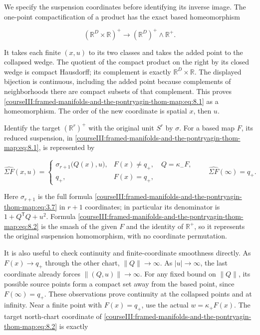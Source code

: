 \label{courseIII:pontryagin-thom:8}

We specify the suspension coordinates before identifying its inverse image. The one-point compactification of a product has the exact based homeomorphism

\begin{equation}
(\mathbb R^D\times\mathbb R)^+
       \longrightarrow(\mathbb R^D)^+\wedge\mathbb R^+.
 \label{courseIII:framed-manifolds-and-the-pontryagin-thom-map:eq:8.1}
\end{equation}

It takes each finite \((x,u)\) to its two classes and takes the added point to the collapsed wedge. The quotient of the compact product on the right by its closed wedge is compact Hausdorff; its complement is exactly \(\mathbb R^D\times\mathbb R\). The displayed bijection is continuous, including the added point because complements of neighborhoods there are compact subsets of that complement. This proves \eqref{courseIII:framed-manifolds-and-the-pontryagin-thom-map:eq:8.1} as a homeomorphism. The order of the new coordinate is spatial \(x\), then \(u\).

Identify the target \((\mathbb R^r)^+\) with the original unit \(S^r\) by \(\sigma\). For a based map \(F\), its reduced suspension, in \eqref{courseIII:framed-manifolds-and-the-pontryagin-thom-map:eq:8.1}, is represented by

\begin{equation}
\widehat{\Sigma F}(x,u)=
 \begin{cases}
 \sigma_{r+1}\bigl(Q(x),u\bigr),&
          F(x)\ne q_+,\quad Q=\kappa_-F,\\
 q_+,&F(x)=q_+,
 \end{cases}
 \qquad
 \widehat{\Sigma F}(\infty)=q_+.
 \label{courseIII:framed-manifolds-and-the-pontryagin-thom-map:eq:8.2}
\end{equation}

Here \(\sigma_{r+1}\) is the full formula \eqref{courseIII:framed-manifolds-and-the-pontryagin-thom-map:eq:3.7} in \(r+1\) coordinates; in particular its denominator is
\(1+Q^{\mathsf T}Q+u^2\). Formula \eqref{courseIII:framed-manifolds-and-the-pontryagin-thom-map:eq:8.2} is the smash of the given \(F\) and the identity of \(\mathbb R^+\), so it represents the original suspension homomorphism, with no coordinate permutation.

It is also useful to check continuity and finite-coordinate smoothness directly. As \(F(x)\to q_+\) through the other chart, \(\|Q\|\to\infty\). As \(|u|\to\infty\), the last coordinate already forces \(\|(Q,u)\|\to\infty\). For any fixed bound on \(\|Q\|\), its possible source points form a compact set away from the based point, since \(F(\infty)=q_+\). These observations prove continuity at the collapsed points and at infinity. Near a finite point with \(F(x)=q_+\), use the actual \(w=\kappa_+F(x)\). The target north-chart coordinate of \eqref{courseIII:framed-manifolds-and-the-pontryagin-thom-map:eq:8.2} is exactly

